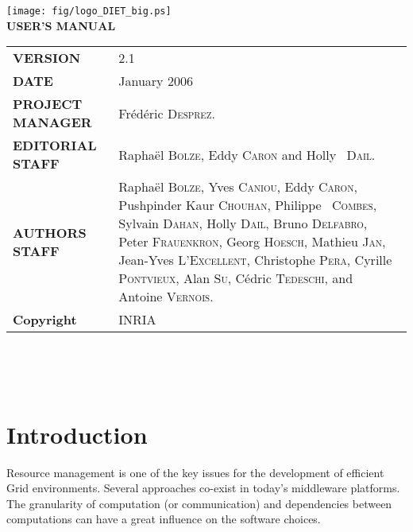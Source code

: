 \documentclass[12pt,a4paper]{book}
\newcommand{\dietversion}{2.1}
\begin{document}

\thispagestyle{empty}
\vspace*{3cm}
\vspace*{3cm}

\begin{center}
\texttt{[image: fig/logo\_DIET\_big.ps]}\\[2ex]
\textbf{\Huge USER'S MANUAL\\[2ex]}
\end{center}

\vfill

\noindent
\small{
\begin{tabular}{ll}
  \textbf{VERSION}  & \dietversion\\
  \textbf{DATE}     & January 2006\\
  \textbf{PROJECT MANAGER}  & Fr\'ed\'eric \textsc{Desprez}.\\
  \textbf{EDITORIAL STAFF}  & Rapha\"el \textsc{Bolze}, Eddy \textsc{Caron} and Holly ~\textsc{Dail}.\\
  \textbf{AUTHORS STAFF}    & 
\begin{minipage}[t]{12cm}
  Rapha\"el \textsc{Bolze}, Yves \textsc{Caniou}, Eddy \textsc{Caron},
  Pushpinder Kaur \textsc{Chouhan}, Philippe ~\textsc{Combes}, Sylvain
  \textsc{Dahan}, Holly \textsc{Dail}, Bruno \textsc{Delfabro}, Peter
  \textsc{Frauenkron}, Georg  \textsc{Hoesch}, Mathieu \textsc{Jan}, 
  Jean-Yves \textsc{L'Excellent}, Christophe \textsc{Pera}, Cyrille
  \textsc{Pontvieux}, Alan \textsc{Su}, C\'edric \textsc{Tedeschi},
  and Antoine \textsc{Vernois}.
\end{minipage} \\
  \textbf{Copyright}& INRIA
\end{tabular}\\
}

\newpage
\thispagestyle{empty}
\ 



\newpage
\tableofcontents


%
%
\newpage
{}
\chapter*{Introduction}

Resource management is one of the key issues for the development of
efficient Grid environments. Several approaches co-exist in today's
middleware platforms. The granularity of computation (or communication) and 
dependencies between computations can have a great influence on the
software choices.
\end{document}
